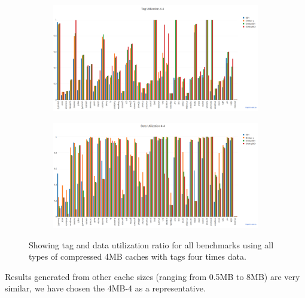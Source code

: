 \begin{figure}
    \begin{subfigure}{\textwidth}
        \includegraphics[width=\textwidth]{all-tagutil.png}
    \end{subfigure}
    \begin{subfigure}{\textwidth}
        \includegraphics[width=\textwidth]{all-datautil.png}
    \end{subfigure}
    \caption[All benchmarks: Utilization]{Showing tag and data utilization ratio for all benchmarks using all types of compressed 4MB caches with tags four times data.}
    \label{fig:all_util}
\end{figure}
Results generated from other cache sizes (ranging from 0.5MB to 8MB) are very similar, we have chosen the 4MB-4 as a representative.

